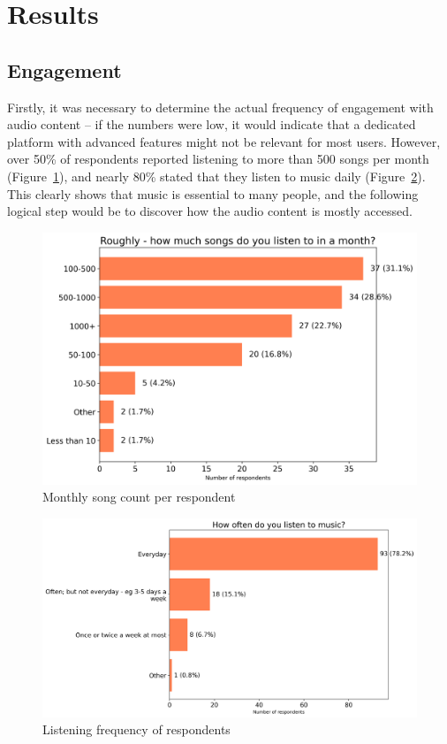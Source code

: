 \section{Results}

\subsection{Engagement}
Firstly, it was necessary to determine the actual frequency of engagement with audio content -- if the numbers were low,
it would indicate that a dedicated platform with advanced features might not be relevant for most users.
However, over 50\% of respondents reported listening to more than 500 songs per month (Figure~\ref{fig:song_amount}),
and nearly 80\% stated that they listen to music daily (Figure~\ref{fig:listen_reg}).
This clearly shows that music is essential to many people, and the following logical step would be to discover
how the audio content is mostly accessed.

\begin{figure}[htbp]
    \centering
    \includegraphics[height=0.4\textheight]{charts/song amount month.png}
    \caption{Monthly song count per respondent}
    \label{fig:song_amount}
\end{figure}

\begin{figure}[htbp]
    \centering
    \includegraphics[height=0.4\textheight]{charts/listening regularity.png}
    \caption{Listening frequency of respondents}
    \label{fig:listen_reg}
\end{figure}

